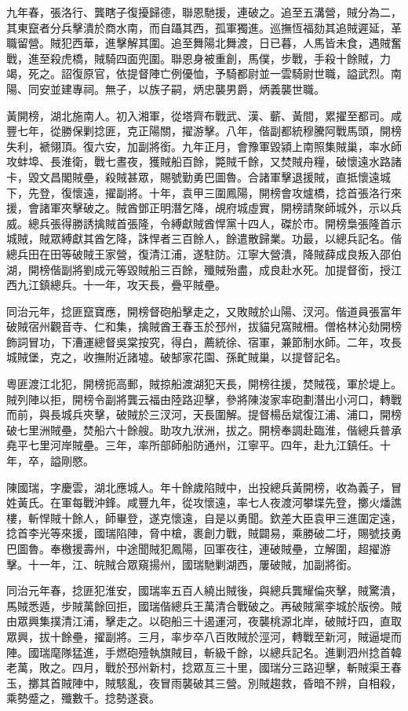 \begin{pinyinscope}
九年春，張洛行、龔瞎子復擾歸德，聯恩馳援，連破之。追至五溝營，賊分為二，其東竄者分兵擊潰於商水南，而自躡其西，孤軍獨進。巡撫恆福劾其追賊遲延，革職留營。賊犯西華，進擊解其圍。追至舞陽北舞渡，日已暮，人馬皆未食，遇賊奮戰，進至殺虎橋，賊騎四面兜圍。聯恩身被重創，馬僕，步戰，手殺十餘賊，力竭，死之。詔復原官，依提督陣亡例優恤，予騎都尉並一雲騎尉世職，謚武烈。南陽、同安並建專祠。無子，以族子嗣，炳忠襲男爵，炳義襲世職。

黃開榜，湖北施南人。初入湘軍，從塔齊布戰武、漢、蘄、黃間，累擢至都司。咸豐七年，從勝保剿捻匪，克正陽關，擢游擊。八年，偕副都統穆騰阿戰馬頭，開榜失利，褫翎頂。復六安，加副將銜。九年正月，會豫軍毀潁上南照集賊巢，率水師攻蚌埠、長淮衛，戰七晝夜，獲賊船百餘，斃賊千餘，又焚賊舟糧，破懷遠水路諸卡，毀文昌閣賊壘，殺賊甚眾，賜號勤勇巴圖魯。合諸軍擊退援賊，直抵懷遠城下，先登，復懷遠，擢副將。十年，袁甲三圍鳳陽，開榜會攻爐橋，捻首張洛行來援，會諸軍夾擊破之。賊酋鄧正明潛乞降，覘府城虛實，開榜請聚師城外，示以兵威。總兵張得勝誘擒賊首張隆，令縛獻賊酋悍黨十四人，磔於市。開榜梟張隆首示城賊，賊眾縛獻其酋乞降，誅悍者三百餘人，餘遣散歸業。功最，以總兵記名。偕總兵田在田等破賊王家營，復清江浦，遂駐防。江寧大營潰，降賊薛成良叛入邵伯湖，開榜偕副將劉成元等毀賊船三百餘，殲賊殆盡，成良赴水死。加提督銜，授江西九江鎮總兵。十一年，攻天長，疊平賊壘。

同治元年，捻匪竄寶應，開榜督砲船擊走之，又敗賊於山陽、汊河。偕道員張富年破賊宿州觀音寺、仁和集，擒賊酋王春玉於邳州，拔貓兒窩賊柵。僧格林沁劾開榜飾詞冒功，下漕運總督吳棠按究，得白，薦統徐、宿軍，兼節制水師。二年，攻長城賊堡，克之，收撫附近諸墟。破郜家花園、孫甿賊巢，以提督記名。

粵匪渡江北犯，開榜扼高郵，賊掠船渡湖犯天長，開榜往援，焚賊筏，軍於堤上。賊列陣以拒，開榜令副將龔云福由陸路迎擊，參將陳浚家率砲劃潛出小河口，轉戰而前，與長城兵夾擊，破賊於三汊河，天長圍解。提督楊岳斌復江浦、浦口，開榜破七里洲賊壘，焚船六十餘艘。助攻九洑洲，拔之。開榜奉調赴臨淮，偕總兵普承堯平七里河岸賊壘。三年，率所部師船防通州，江寧平。四年，赴九江鎮任。十年，卒，謚剛愍。

陳國瑞，字慶雲，湖北應城人。年十餘歲陷賊中，出投總兵黃開榜，收為義子，冒姓黃氏。在軍每戰沖鋒。咸豐九年，從攻懷遠，率七人夜渡河攀堞先登，擲火燔譙樓，斬悍賊十餘人，師畢登，遂克懷遠，自是以勇聞。欽差大臣袁甲三進圍定遠，捻首李光等來援，國瑞陷陣，脅中槍，裹創力戰，賊闢易，乘勝破二圩，賜號技勇巴圖魯。奉檄援壽州，中途聞賊犯鳳陽，回軍夜往，連破賊壘，立解圍，超擢游擊。十一年，江、皖賊合眾窺揚州，國瑞馳剿湖西，屢破賊，加副將銜。

同治元年春，捻匪犯淮安，國瑞率五百人繞出賊後，與總兵龔耀倫夾擊，賊驚潰，馬賊悉遁，步賊萬餘回拒，國瑞偕總兵王萬清合戰破之。再破賊黨李城於版徬。賊由眾興集撲清江浦，擊走之。以砲船三十遏運河，夜襲桃源北岸，破賊圩四，直取眾興，拔十餘壘，擢副將。三月，率步卒八百敗賊於涇河，轉戰至新河，賊逼堤而陣。國瑞麾隊猛進，手燃砲殪執旗賊目，斬級千餘，以總兵記名。進剿泗州捻首韓老萬，敗之。四月，戰於邳州新村，捻眾亙三十里，國瑞分三路迎擊，斬賊渠王春玉，擲其首賊陣中，賊駭亂，夜冒雨襲破其三營。別賊趨救，昏暗不辨，自相殺，乘勢蹙之，殲數千。捻勢遂衰。


\end{pinyinscope}
